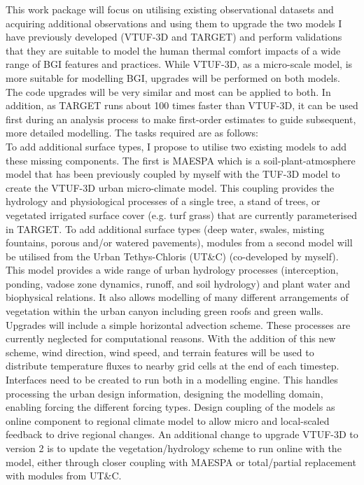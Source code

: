 This work package will focus on utilising existing observational datasets and acquiring additional observations and using them to upgrade the two models I have previously developed (VTUF-3D and TARGET) and perform validations that they are suitable to model the human thermal comfort impacts of a wide range of BGI features and practices. While VTUF-3D, as a micro-scale model, is more suitable for modelling BGI, upgrades will be performed on both models. The code upgrades will be very similar and most can be applied to both. In addition, as TARGET runs about 100 times faster than VTUF-3D, it can be used first during an analysis process to make first-order estimates to guide subsequent, more detailed modelling.  The tasks required are as follows:
\\[6pt]
To add additional surface types, I propose to utilise two existing models to add these missing components. The first is MAESPA\cite{Duursma2012} which is a soil-plant-atmosphere model that has been previously coupled by myself with the TUF-3D model\cite{Krayenhoff2007} to create the VTUF-3D\textbf{\cite{Nice2018a}} urban micro-climate model. This coupling provides the hydrology and physiological processes of a single tree, a stand of trees, or vegetated irrigated surface cover (e.g. turf grass) that are currently parameterised in TARGET. To add additional surface types (deep water, swales, misting fountains, porous and/or watered pavements), modules from a second model will be utilised from the Urban Tethys-Chloris (UT\&C)\textbf{\cite{Meili2020}} (co-developed by myself). This model provides a wide range of urban hydrology processes (interception, ponding, vadose zone dynamics, runoff, and soil hydrology) and plant water and biophysical relations. It also allows modelling of many different arrangements of vegetation within the urban canyon including green roofs and green walls. Upgrades will include a simple horizontal advection scheme. These processes are currently neglected for computational reasons. With the addition of this new scheme, wind direction, wind speed, and terrain features will be used to distribute temperature fluxes to nearby grid cells at the end of each timestep. Interfaces need to be created to run both in a modelling engine. This handles processing the urban design information, designing the modelling domain, enabling forcing the different forcing types. Design coupling of the models as online component to regional climate model to allow micro and local-scaled feedback to drive regional changes. An additional change to upgrade VTUF-3D to version 2 is to update the vegetation/hydrology scheme to run online with the model, either through closer coupling with MAESPA\cite{Duursma2012} or total/partial replacement with modules from UT\&C\textbf{\cite{Meili2020}}. 

